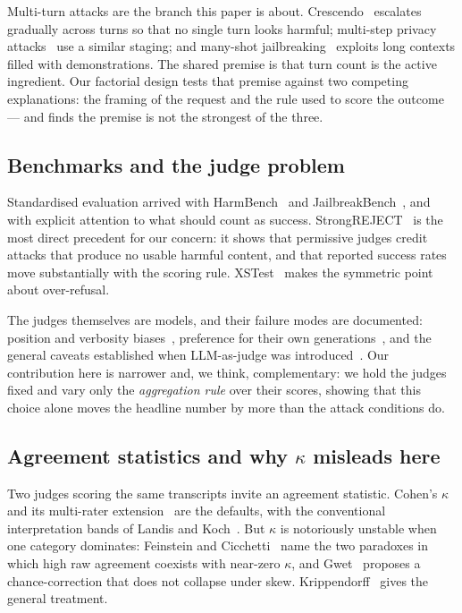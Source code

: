 \documentclass[journal]{IEEEtran}
\providecommand{\citep}[1]{\cite{#1}}
\theoremstyle{definition}
\begin{document}
Multi-turn attacks are the branch this paper is about.
Crescendo~\citep{russinovich2025crescendo} escalates gradually across turns so
that no single turn looks harmful; multi-step privacy
attacks~\citep{li2023multistep} use a similar staging; and many-shot
jailbreaking~\citep{anil2024manyshot} exploits long contexts filled with
demonstrations. The shared premise is that turn count is the active ingredient.
Our factorial design tests that premise against two competing explanations: the framing of the request and the rule used to score the outcome --- and finds
the premise is not the strongest of the three.

\subsection{Benchmarks and the judge problem}

Standardised evaluation arrived with HarmBench~\citep{mazeika2024harmbench} and
JailbreakBench~\citep{chao2024jailbreakbench}, and with explicit attention to
what should count as success. StrongREJECT~\citep{souly2024strongreject} is the
most direct precedent for our concern: it shows that permissive judges credit
attacks that produce no usable harmful content, and that reported success rates
move substantially with the scoring rule. XSTest~\citep{rottger2024xstest} makes
the symmetric point about over-refusal.

The judges themselves are models, and their failure modes are
documented: position and verbosity biases~\citep{wang2024unfair}, preference for
their own generations~\citep{panickssery2024self}, and the general caveats
established when LLM-as-judge was introduced~\citep{zheng2023judge}. Our
contribution here is narrower and, we think, complementary: we hold the judges
fixed and vary only the \emph{aggregation rule} over their scores, showing that
this choice alone moves the headline number by more than the attack conditions
do.

\subsection{Agreement statistics and why $\kappa$ misleads here}

Two judges scoring the same transcripts invite an agreement statistic.
Cohen's $\kappa$~\citep{cohen1960kappa} and its multi-rater
extension~\citep{fleiss1971kappa} are the defaults, with the conventional
interpretation bands of Landis and Koch~\citep{landis1977kappa}. But $\kappa$ is
notoriously unstable when one category dominates: Feinstein and
Cicchetti~\citep{feinstein1990paradox} name the two paradoxes in which high raw
agreement coexists with near-zero $\kappa$, and Gwet~\citep{gwet2008ac1} proposes
a chance-correction that does not collapse under skew.
Krippendorff~\citep{krippendorff2004content} gives the general treatment.
\end{document}
